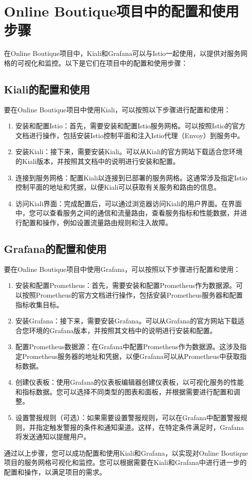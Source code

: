 \section{Online Boutique项目中的配置和使用步骤}

在Online Boutique项目中，Kiali和Grafana可以与Istio一起使用，以提供对服务网格的可视化和监控。以下是它们在项目中的配置和使用步骤：

\subsection{Kiali的配置和使用}

要在Online Boutique项目中使用Kiali，可以按照以下步骤进行配置和使用：

\begin{enumerate}
	\item 安装和配置Istio：首先，需要安装和配置Istio服务网格。可以按照Istio的官方文档进行操作，包括安装Istio控制平面和注入Istio代理（Envoy）到服务中。
	\item 安装Kiali：接下来，需要安装Kiali。可以从Kiali的官方网站下载适合您环境的Kiali版本，并按照其文档中的说明进行安装和配置。
	\item 连接到服务网格：配置Kiali以连接到已部署的服务网格。这通常涉及指定Istio控制平面的地址和凭据，以便Kiali可以获取有关服务和路由的信息。
	\item 访问Kiali界面：完成配置后，可以通过浏览器访问Kiali的用户界面。在界面中，您可以查看服务之间的通信和流量路由，查看服务指标和性能数据，并进行配置和操作，例如设置流量路由规则和注入故障。
\end{enumerate}

\subsection{Grafana的配置和使用}

要在Online Boutique项目中使用Grafana，可以按照以下步骤进行配置和使用：

\begin{enumerate}
	\item 安装和配置Prometheus：首先，需要安装和配置Prometheus作为数据源。可以按照Prometheus的官方文档进行操作，包括安装Prometheus服务器和配置指标收集目标。
	\item 安装Grafana：接下来，需要安装Grafana。可以从Grafana的官方网站下载适合您环境的Grafana版本，并按照其文档中的说明进行安装和配置。
	\item 配置Prometheus数据源：在Grafana中配置Prometheus作为数据源。这涉及指定Prometheus服务器的地址和凭据，以便Grafana可以从Prometheus中获取指标数据。
	\item 创建仪表板：使用Grafana的仪表板编辑器创建仪表板，以可视化服务的性能和指标数据。您可以选择不同类型的图表和面板，并根据需要进行配置和调整。
	\item 设置警报规则（可选）：如果需要设置警报规则，可以在Grafana中配置警报规则，并指定触发警报的条件和通知渠道。这样，在特定条件满足时，Grafana将发送通知以提醒用户。
\end{enumerate}

通过以上步骤，您可以成功配置和使用Kiali和Grafana，以实现对Online Boutique项目的服务网格可视化和监控。您可以根据需要在Kiali和Grafana中进行进一步的配置和操作，以满足项目的需求。